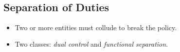 %
%
%
%
%
%

\subsection{Separation of Duties}

\begin{frame}
  \begin{definition}
    \begin{itemize}
      \item Two or more entities must collude to break the policy.
      \item Two classes: \emph{dual control} and \emph{functional separation}.
    \end{itemize}
  \end{definition}
\end{frame}

